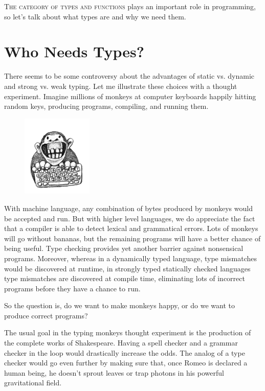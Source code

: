 
\lettrine[lhang=0.17]{T}{he category of types and functions} plays an important role in
programming, so let's talk about what types are and why we need them.

\section{Who Needs Types?}

There seems to be some controversy about the advantages of static vs.
dynamic and strong vs. weak typing. Let me illustrate these choices with
a thought experiment. Imagine millions of monkeys at computer keyboards
happily hitting random keys, producing programs, compiling, and running
them.

\begin{figure}[H]
\centering
\includegraphics[width=0.3\textwidth]{images/img_1329.jpg}
\end{figure}

\noindent
With machine language, any combination of bytes produced by monkeys
would be accepted and run. But with higher level languages, we do
appreciate the fact that a compiler is able to detect lexical and
grammatical errors. Lots of monkeys will go without bananas, but the
remaining programs will have a better chance of being useful. Type
checking provides yet another barrier against nonsensical programs.
Moreover, whereas in a dynamically typed language, type mismatches would
be discovered at runtime, in strongly typed statically checked languages
type mismatches are discovered at compile time, eliminating lots of
incorrect programs before they have a chance to run.

So the question is, do we want to make monkeys happy, or do we want to
produce correct programs?

The usual goal in the typing monkeys thought experiment is the
production of the complete works of Shakespeare. Having a spell checker
and a grammar checker in the loop would drastically increase the odds.
The analog of a type checker would go even further by making sure that,
once Romeo is declared a human being, he doesn't sprout leaves or trap
photons in his powerful gravitational field.

